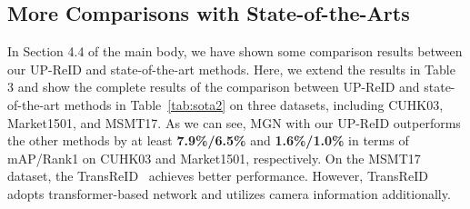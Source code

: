 \documentclass[10pt,twocolumn,letterpaper]{article}
\begin{document}
\subsection{More Comparisons with State-of-the-Arts}
In Section 4.4 of the main body, we have shown some comparison results between our UP-ReID and state-of-the-art methods. Here, we extend the results in Table 3 and show the complete results of the comparison between UP-ReID and state-of-the-art methods in Table~\ref{tab:sota2} on three datasets, including CUHK03, Market1501, and MSMT17.
As we can see, MGN with our UP-ReID outperforms the other methods by at least \textbf{7.9\%/6.5\%} and \textbf{1.6\%/1.0\%} in terms of mAP/Rank1 on CUHK03 and Market1501, respectively. On the MSMT17 dataset, the TransReID~\cite{he2021transreid} achieves better performance. However, TransReID adopts transformer-based network and utilizes camera information additionally.
\end{document}
